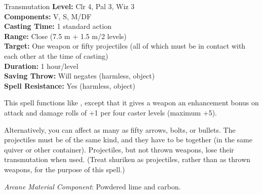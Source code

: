 {Transmutation}
{
	\textbf{Level:}
	Clr 4, Pal 3, Wiz 3\\
	\textbf{Components:}
	V, S, M/DF\\
	\textbf{Casting Time:}
	1 standard action\\
	\textbf{Range:}
	Close (7.5 m + 1.5 m/2 levels)\\
	\textbf{Target:}
	One weapon or fifty projectiles (all of which must be in contact with each other at the time of casting)\\
	\textbf{Duration:}
	1 hour/level\\
	\textbf{Saving Throw:}
	Will negates (harmless, object)\\
	\textbf{Spell Resistance:}
	Yes (harmless, object)\\
}
{
	This spell functions like , except that it gives a weapon an enhancement bonus on attack and damage rolls of +1 per four caster levels (maximum +5).

	Alternatively, you can affect as many as fifty arrows, bolts, or bullets. The projectiles must be of the same kind, and they have to be together (in the same quiver or other container). Projectiles, but not thrown weapons, lose their transmutation when used. (Treat shuriken as projectiles, rather than as thrown weapons, for the purpose of this spell.)

	\textit{Arcane Material Component}:
	Powdered lime and carbon.

}
